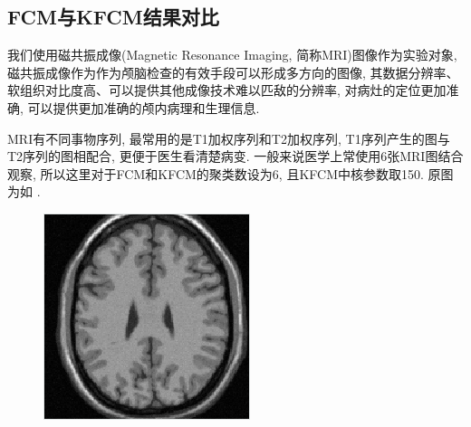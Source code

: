 \documentclass[lang=cn,11pt]{elegantpaper}
\begin{document}
\subsection{FCM与KFCM结果对比}
我们使用磁共振成像(Magnetic Resonance Imaging, 简称MRI)图像作为实验对象, 磁共振成像作为作为颅脑检查的有效手段可以形成多方向的图像, 其数据分辨率、软组织对比度高、可以提供其他成像技术难以匹敌的分辨率, 对病灶的定位更加准确, 可以提供更加准确的颅内病理和生理信息. 

MRI有不同事物序列, 最常用的是T1加权序列和T2加权序列, T1序列产生的图与T2序列的图相配合, 更便于医生看清楚病变. 一般来说医学上常使用6张MRI图结合观察, 所以这里对于FCM和KFCM的聚类数设为6, 且KFCM中核参数取150. 原图为如 .
\begin{figure}[ht]
    \centering
    \includegraphics[width=.35\textwidth]{Brain/Origin}
    \caption{\label{fig:BO}}
\end{figure}
\end{document}
